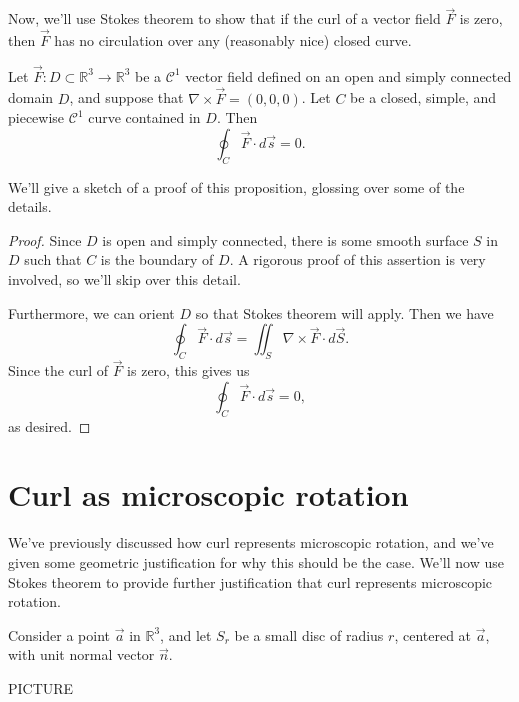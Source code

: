 \documentclass{ximera}
\begin{document}
Now, we'll use Stokes theorem to show that if the curl of a vector field $\vec{F}$ is zero, then $\vec{F}$ has no circulation over any (reasonably nice) closed curve.

\begin{proposition}
Let $\vec{F}:D\subset\mathbb{R}^3\rightarrow\mathbb{R}^3$ be a $\mathcal{C}^1$ vector field defined on an open and simply connected domain $D$, and suppose that $\nabla \times\vec{F} = (0,0,0)$. Let $C$ be a closed, simple, and piecewise $\mathcal{C}^1$ curve contained in $D$. Then 
\[
\oint_C\vec{F}\cdot d\vec{s} = 0.
\]
\end{proposition}

We'll give a sketch of a proof of this proposition, glossing over some of the details.

\begin{proof}
Since $D$ is open and simply connected, there is some smooth surface $S$ in $D$ such that $C$ is the boundary of $D$. A rigorous proof of this assertion is very involved, so we'll skip over this detail.

Furthermore, we can orient $D$ so that Stokes theorem will apply. Then we have
\[
\oint_C\vec{F}\cdot d\vec{s} = \iint_S\nabla\times \vec{F}\cdot d\vec{S}.
\]
Since the curl of $\vec{F}$ is zero, this gives us
\[
\oint_C\vec{F}\cdot d\vec{s}=0,
\]
as desired.
\end{proof}

\section*{Curl as microscopic rotation}

We've previously discussed how curl represents microscopic rotation, and we've given some geometric justification for why this should be the case. We'll now use Stokes theorem to provide further justification that curl represents microscopic rotation.

Consider a point $\vec{a}$ in $\mathbb{R}^3$, and let $S_r$ be a small disc of radius $r$, centered at $\vec{a}$, with unit normal vector $\vec{n}$.

PICTURE
\end{document}
